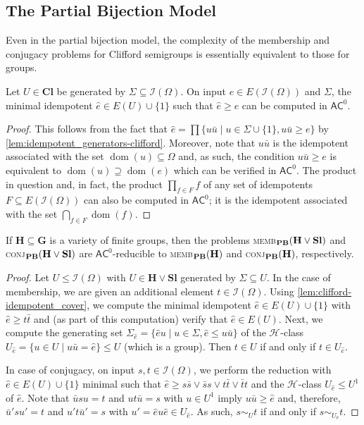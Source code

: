 \documentclass[anonymous,letter,UKenglish,cleveref,autoref,thm-restate]{lipics-v2021}
\renewcommand{\geq}{\geqslant}
\renewcommand{\leq}{\leqslant}
\newcommand{\sse}{\subseteq}
\newcommand{\dom}{\operatorname{dom}}
\newcommand{\ACz}{\ensuremath{\mathsf{AC}^0}\xspace}
\newcommand{\vH}{\ensuremath{\mathbf{H}}}
\newcommand{\vG}{\ensuremath{\mathbf{G}}}
\newcommand{\vSl}{\ensuremath{\mathbf{Sl}}}
\newcommand{\vCl}{\ensuremath{\mathbf{Cl}}}
\newcommand{\ISym}{\cI}
\newcommand*{\gH}[1][]{\mathrel{\mathcal{H}_{#1}}}
\newcommand{\cI}{\mathcal{I}}
\theoremstyle{plain}
\theoremstyle{plain}
\newcommand{\dMemb}[2][]{\textup{\textsc{memb${}_{\mathbf{#1}}\expandafter\ifx\expandafter\relax\detokenize{#2}\relax\else(#2)\fi$}}}
\newcommand{\dConj}[2][]{\textup{\textsc{conj${}_{\mathbf{#1}}\expandafter\ifx\expandafter\relax\detokenize{#2}\relax\else(#2)\fi$}}}
\begin{document}
\subsection{The Partial Bijection Model}\label{sub:clifford-pb}

Even in the partial bijection model, the complexity of the membership and conjugacy problems for Clifford semigroups is essentially equivalent to those for groups.

\begin{lemma}\label{lem:clifford-idempotent_cover}
  Let $U \in \vCl$ be generated by $\Sigma \sse \ISym(\Omega)$.
	On input $e \in E(\ISym(\Omega))$ and $\Sigma$, the minimal idempotent $\hat e \in E(U) \cup \{ 1 \}$ such that $\hat e \geq e$ can be computed in $\ACz$.
\end{lemma}
\begin{proof}
  This follows from the fact that $\hat e = \prod \{ u \bar u \mid u \in \Sigma \cup \{1\}, u \bar u \geq e \}$ by \cref{lem:idempotent_generators-clifford}.
  Moreover, note that $u \bar u$ is the idempotent associated with the set $\dom(u) \sse \Omega$ and, as such, the condition $u \bar u \geq e$ is equivalent to $\dom(u) \supseteq \dom(e)$ which can be verified in \ACz.
  The product in question and, in fact, the product $\prod_{f \in F} f$ of any set of idempotents $F \sse E(\ISym(\Omega))$ can also be computed in \ACz; it is the idempotent associated with the set $\bigcap_{f \in F} \dom(f)$.
\end{proof}

\begin{proposition}\label{pro:pbm-clifford}
  If $\vH \sse \vG$ is a variety of finite groups, then the problems \dMemb[PB]{\vH\vee\vSl} and \dConj[PB]{\vH\vee\vSl} are $\ACz$-reducible to \dMemb[PB]{\vH} and \dConj[PB]{\vH}, respectively.
\end{proposition}

\begin{proof}
	Let $U \leq \ISym(\Omega)$ with $U \in \vH \vee \vSl$ generated by $\Sigma \subseteq U$.
	In the case of membership, we are given an additional element $t \in \ISym(\Omega)$.
  Using \cref{lem:clifford-idempotent_cover}, we compute the minimal idempotent $\hat e \in E(U) \cup \{1\}$ with $\hat e \geq t\bar t$ and (as part of this computation) verify that $\hat e \in E(U)$.
  Next, we compute the generating set $\Sigma_{\hat e} = \{ \hat e u \mid u \in \Sigma, \hat e \leq u \bar u \}$ of the $\gH$-class $U_{\hat e} = \{ u \in U \mid u \bar u = \hat e \} \leq U$ (which is a group).
	Then $t \in U$ if and only if $t \in U_{\hat e}$.

	
	In case of conjugacy, on input $s,t \in \ISym(\Omega)$, we perform the reduction with $\hat e \in E(U) \cup \{1\}$ minimal such that $\hat e \geq s\bar s \vee \bar s s \vee t \bar t \vee \bar t t$ and the $\gH$-class $U_{\hat e} \leq U^1$ of $\hat e$.
	Note that $\bar u s u = t$ and $u t \bar u = s$ with $u \in U^1$ imply $u \bar u \geq \hat e$ and, therefore, $\bar u' s u' = t$ and $u' t \bar u' = s$ with $u' = \hat e u \hat e \in U_{\hat e}$.
	As such, $s \sim_U t$ if and only if $s \sim_{U_{\hat e}} t$.
\end{proof}
\end{document}
